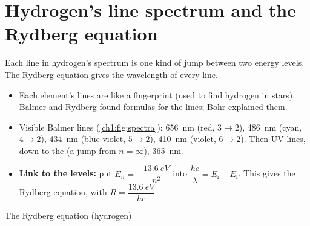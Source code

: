 \section{Hydrogen's line spectrum and the Rydberg equation}\label{ch3:sec:rydberg}

\begin{bigidea}
Each line in hydrogen's spectrum is one kind of jump between two energy levels. The Rydberg
equation gives the wavelength of every line.
\end{bigidea}

\begin{keywords}
\end{keywords}

\begin{itemize}
  \item Each element's lines are like a fingerprint (used to find hydrogen in stars). Balmer
        and Rydberg found formulas for the lines; Bohr explained them.
  \item Visible Balmer lines (\cref{ch1:fig:spectra}): \qty{656}{nm} (red, $3 \to 2$),
        \qty{486}{nm} (cyan, $4 \to 2$), \qty{434}{nm} (blue-violet, $5 \to 2$), \qty{410}{nm}
        (violet, $6 \to 2$). Then UV lines, down to the  (a jump from
        $n = \infty$), \qty{365}{nm}.
  \item \textbf{Link to the levels:} put $E_n = -\dfrac{\qty{13.6}{eV}}{n^2}$ into
        $\dfrac{hc}{\lambda} = E_\mathrm{i} - E_\mathrm{f}$. This gives the Rydberg equation,
        with $R = \dfrac{\qty{13.6}{eV}}{hc}$.
\end{itemize}


\begin{formulacard}{The Rydberg equation (hydrogen)}
  \begin{symbols}
  \end{symbols}
\end{formulacard}

